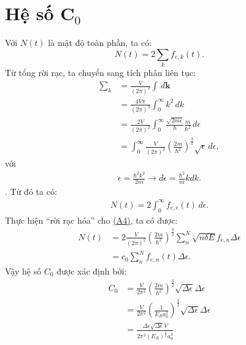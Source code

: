 \documentclass[%
reprint,
amsmath,amssymb,
superscriptaddress,
aps,
]{revtex4-2}
\begin{document}
\section{\label{apendix A}Hệ số $\mathbf{C}_0$}
\noindent Với $N(t)$ là mật độ toàn phần, ta có:
\begin{equation}
	N(t) = 2 \sum_k f_{e,k} (t).
\end{equation}
Từ tổng rời rạc, ta chuyển sang tích phân liên tục:
\begin{equation}
	\begin{aligned}
		\sum_k 
		&= \frac{V}{(2\pi)^2} \int \, d\mathbf{k} \\
		&= \frac{4V\pi}{(2\pi)^3} \int_{0}^{\infty} k^2\, dk \\
		&= \frac{2V}{(2\pi)^2} \int_{0}^{\infty} \frac{\sqrt{2m\epsilon}}{\hbar} \frac{m}{\hbar^2} \, d\epsilon  \\
		&= \int_{0}^{\infty} \frac{V}{(2\pi)^2}	(\frac{2m}{\hbar^2})^\frac{3}{2} \sqrt{\epsilon} \, d\epsilon ,
	\end{aligned}
\end{equation}
với 
\begin{align}
	\epsilon = \frac{\hbar^2 k^2}{2m} \rightarrow d\epsilon = \frac{\hbar^2}{m} kdk.
\end{align}.
Từ đó ta có:
\begin{equation}
	\begin{aligned}
		N(t) = 2 \int_{0}^{\infty} f_{e,\epsilon} (t) \, d\epsilon. \label{A4}
	\end{aligned}
\end{equation}
Thực hiện ``rời rạc hóa'' cho \hyperref[A4]{(A4)}, ta có được:
\begin{equation}
	\begin{aligned}
		N(t) 
		&= 2 \frac{V}{(2\pi)^2} (\frac{2m}{\hbar^2})^\frac{3}{2} \sum_n^N \sqrt{n\delta E} f_{e,n} \Delta \epsilon \\
		&= c_0 \sum_n^N f_{e,n}(t) \Delta \epsilon.
	\end{aligned}
\end{equation}
Vậy hệ số $C_0$ được xác định bởi:
\begin{equation}
	\begin{aligned}
		C_0 
		&= \frac{V}{2\pi^2} (\frac{2m}{\hbar^2})^\frac{3}{2} \sqrt{\Delta \epsilon} \Delta \epsilon\\
		&= \frac{V}{2\pi^2} (\frac{1}{E_R a_0^2})^\frac{3}{2}  \sqrt{\Delta \epsilon} \Delta \epsilon\\
		&= \frac{\Delta \epsilon \sqrt{\Delta \epsilon}V}{2\pi^2 (E_R)^\frac{3}{2} a_0^3}
	\end{aligned}
\end{equation}
\end{document}
